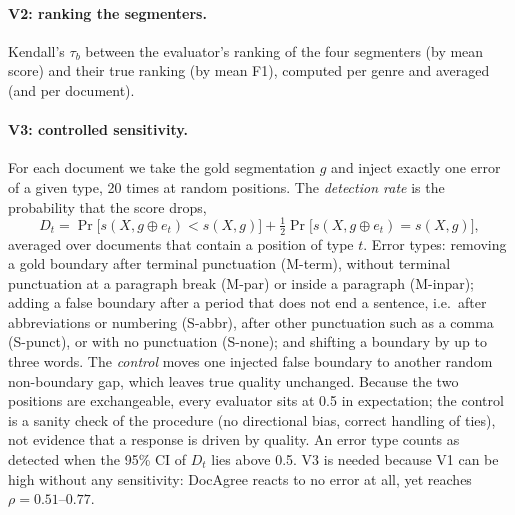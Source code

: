 \paragraph{V2: ranking the segmenters.} Kendall's $\tau_b$ between the evaluator's ranking of the four segmenters (by mean
score) and their true ranking (by mean F1), computed per genre and averaged (and per document).

\paragraph{V3: controlled sensitivity.} For each document we take the gold segmentation $g$ and inject exactly one error
of a given type, 20 times at random positions. The \emph{detection rate} is the probability that the score drops,
\begin{equation}
  D_t = \Pr\big[s(X, g \oplus e_t) < s(X, g)\big] + \tfrac12 \Pr\big[s(X, g \oplus e_t) = s(X, g)\big],
  \label{eq:detection}
\end{equation}
averaged over documents that contain a position of type $t$. Error types: removing a gold boundary after terminal
punctuation (M-term), without terminal punctuation at a paragraph break (M-par) or inside a paragraph (M-inpar); adding a
false boundary after a period that does not end a sentence, i.e.\ after abbreviations or numbering (S-abbr), after other
punctuation such as a comma (S-punct), or with no punctuation (S-none); and shifting a boundary by up to three words. The
\emph{control} moves one injected false boundary to another random non-boundary gap, which leaves true quality
unchanged. Because the two positions are exchangeable, every evaluator sits at 0.5 in expectation; the control is a
sanity check of the procedure (no directional bias, correct handling of ties), not evidence that a response is driven by
quality. An error type counts as detected when the 95\% CI of $D_t$ lies above 0.5. V3 is needed because V1 can be high
without any sensitivity: DocAgree reacts to no error at all, yet reaches $\rho = 0.51$--$0.77$.

